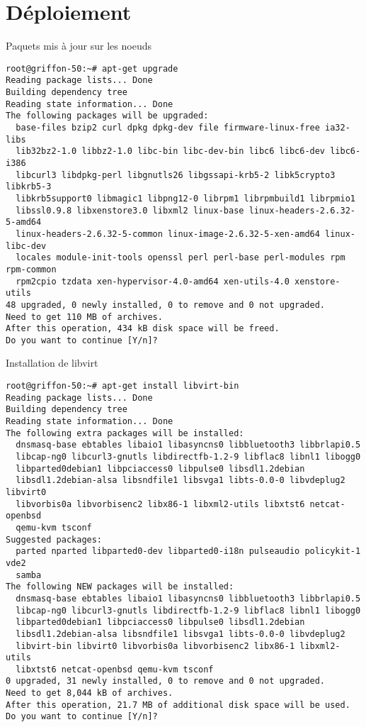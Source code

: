 \documentclass{article}
\begin{document}
\section{Déploiement}
Paquets mis à jour sur les noeuds
\begin{lstlisting}
root@griffon-50:~# apt-get upgrade
Reading package lists... Done
Building dependency tree       
Reading state information... Done
The following packages will be upgraded:
  base-files bzip2 curl dpkg dpkg-dev file firmware-linux-free ia32-libs
  lib32bz2-1.0 libbz2-1.0 libc-bin libc-dev-bin libc6 libc6-dev libc6-i386
  libcurl3 libdpkg-perl libgnutls26 libgssapi-krb5-2 libk5crypto3 libkrb5-3
  libkrb5support0 libmagic1 libpng12-0 librpm1 librpmbuild1 librpmio1
  libssl0.9.8 libxenstore3.0 libxml2 linux-base linux-headers-2.6.32-5-amd64
  linux-headers-2.6.32-5-common linux-image-2.6.32-5-xen-amd64 linux-libc-dev
  locales module-init-tools openssl perl perl-base perl-modules rpm rpm-common
  rpm2cpio tzdata xen-hypervisor-4.0-amd64 xen-utils-4.0 xenstore-utils
48 upgraded, 0 newly installed, 0 to remove and 0 not upgraded.
Need to get 110 MB of archives.
After this operation, 434 kB disk space will be freed.
Do you want to continue [Y/n]? 
\end{lstlisting}
Installation de libvirt
\begin{lstlisting}
root@griffon-50:~# apt-get install libvirt-bin
Reading package lists... Done
Building dependency tree       
Reading state information... Done
The following extra packages will be installed:
  dnsmasq-base ebtables libaio1 libasyncns0 libbluetooth3 libbrlapi0.5
  libcap-ng0 libcurl3-gnutls libdirectfb-1.2-9 libflac8 libnl1 libogg0
  libparted0debian1 libpciaccess0 libpulse0 libsdl1.2debian
  libsdl1.2debian-alsa libsndfile1 libsvga1 libts-0.0-0 libvdeplug2 libvirt0
  libvorbis0a libvorbisenc2 libx86-1 libxml2-utils libxtst6 netcat-openbsd
  qemu-kvm tsconf
Suggested packages:
  parted nparted libparted0-dev libparted0-i18n pulseaudio policykit-1 vde2
  samba
The following NEW packages will be installed:
  dnsmasq-base ebtables libaio1 libasyncns0 libbluetooth3 libbrlapi0.5
  libcap-ng0 libcurl3-gnutls libdirectfb-1.2-9 libflac8 libnl1 libogg0
  libparted0debian1 libpciaccess0 libpulse0 libsdl1.2debian
  libsdl1.2debian-alsa libsndfile1 libsvga1 libts-0.0-0 libvdeplug2
  libvirt-bin libvirt0 libvorbis0a libvorbisenc2 libx86-1 libxml2-utils
  libxtst6 netcat-openbsd qemu-kvm tsconf
0 upgraded, 31 newly installed, 0 to remove and 0 not upgraded.
Need to get 8,044 kB of archives.
After this operation, 21.7 MB of additional disk space will be used.
Do you want to continue [Y/n]? 
\end{lstlisting}
\end{document}
